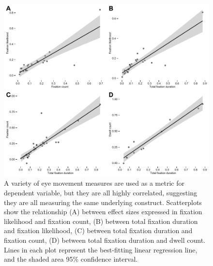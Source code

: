 \documentclass[english,natbib,man,floatsintext]{apa6}
\begin{document}

\clearpage


\begin{figure}%
\includegraphics{metric_correction}
\centering
\caption{A variety of eye movement measures are used as a metric for dependent variable, but they are all highly correlated, suggesting they are all measuring the same underlying construct. Scatterplots show the relationship (A) between effect sizes expressed in fixation likelihood and fixation count, (B) between total fixation duration and fixation likelihood, (C) between total fixation duration and fixation count, (D) between total fixation duration and dwell count. Lines in each plot represent the best-fitting linear regression line, and the shaded area 95\% confidence interval.}
\label{fig:metric_correction}
\end{figure}
\clearpage



\clearpage



\clearpage

%
\end{document}
